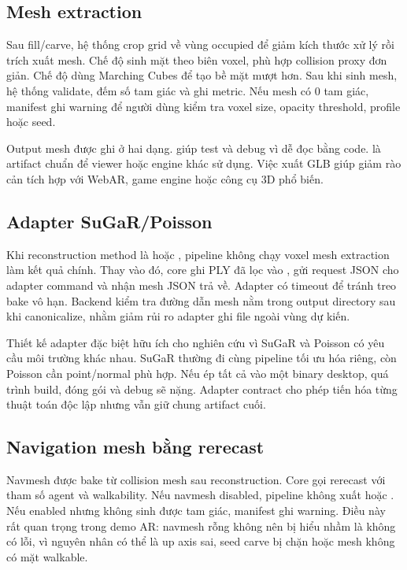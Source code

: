 \subsection{Mesh extraction}

Sau fill/carve, hệ thống crop grid về vùng occupied để giảm kích thước xử lý rồi trích xuất mesh. Chế độ  sinh mặt theo biên voxel, phù hợp collision proxy đơn giản. Chế độ  dùng Marching Cubes để tạo bề mặt mượt hơn. Sau khi sinh mesh, hệ thống validate, đếm số tam giác và ghi metric. Nếu mesh có 0 tam giác, manifest ghi warning để người dùng kiểm tra voxel size, opacity threshold, profile hoặc seed.

Output mesh được ghi ở hai dạng.  giúp test và debug vì dễ đọc bằng code.  là artifact chuẩn để viewer hoặc engine khác sử dụng. Việc xuất GLB giúp giảm rào cản tích hợp với WebAR, game engine hoặc công cụ 3D phổ biến.

\subsection{Adapter SuGaR/Poisson}

Khi reconstruction method là  hoặc , pipeline không chạy voxel mesh extraction làm kết quả chính. Thay vào đó, core ghi PLY đã lọc vào , gửi request JSON cho adapter command và nhận mesh JSON trả về. Adapter có timeout để tránh treo bake vô hạn. Backend kiểm tra đường dẫn mesh nằm trong output directory sau khi canonicalize, nhằm giảm rủi ro adapter ghi file ngoài vùng dự kiến.

Thiết kế adapter đặc biệt hữu ích cho nghiên cứu vì SuGaR và Poisson có yêu cầu môi trường khác nhau. SuGaR thường đi cùng pipeline tối ưu hóa riêng, còn Poisson cần point/normal phù hợp. Nếu ép tất cả vào một binary desktop, quá trình build, đóng gói và debug sẽ nặng. Adapter contract cho phép tiến hóa từng thuật toán độc lập nhưng vẫn giữ chung artifact cuối.

\subsection{Navigation mesh bằng rerecast}

Navmesh được bake từ collision mesh sau reconstruction. Core gọi rerecast với tham số agent và walkability. Nếu navmesh disabled, pipeline không xuất  hoặc . Nếu enabled nhưng không sinh được tam giác, manifest ghi warning. Điều này rất quan trọng trong demo AR: navmesh rỗng không nên bị hiểu nhầm là không có lỗi, vì nguyên nhân có thể là up axis sai, seed carve bị chặn hoặc mesh không có mặt walkable.

